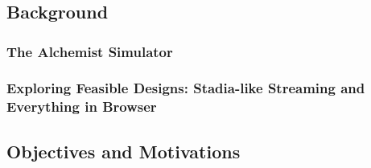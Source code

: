 \chapter{\introductionname}
\label{chap:introduction}
\section{Background}
\label{sec:background}
\subsection{The Alchemist Simulator}
\label{ssec:the-alchemist-simulator}
\subsection{Exploring Feasible Designs: Stadia-like Streaming and Everything in Browser}
\label{ssec:exploring-feasible-designs-stadia-like-streaming-and-everything-in-browser}
\section{Objectives and Motivations}
\label{sec:objectives-and-motivations}
